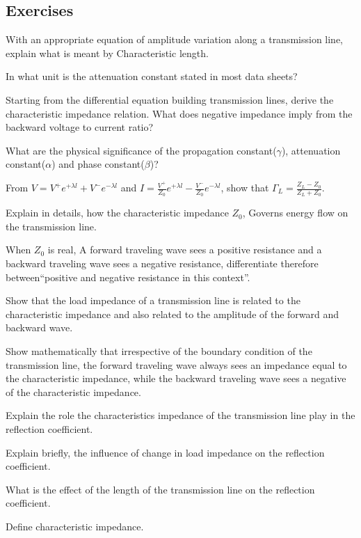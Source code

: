 \begin{mdframed}[backgroundcolor=lightblue, linewidth=1pt, hidealllines=true]
\section*{Exercises}
\begin{ExerciseList}
\Exercise[label={ex31}]
With an appropriate equation of amplitude variation along a transmission line, explain what is meant by Characteristic length.

\Exercise[label={ex32}]
In what unit is the attenuation constant stated in most data sheets?

\Exercise[label={ex33}]
Starting from the differential equation building transmission lines, derive the characteristic impedance relation. What does negative impedance imply from the backward voltage to current ratio?

\Exercise[label={ex34}]
What are the physical significance of the propagation constant($\gamma$), attenuation constant($\alpha$) and phase constant($\beta$)?

\Exercise[label={ex36}]
From $ V = V^+e^{+\lambda l} + V^-e^{-\lambda l} $ and $ I = \frac{V^+}{Z_0}e^{+\lambda l} - \frac{V^-}{Z_0}e^{-\lambda l}$, show that $ \Gamma_L = \frac{Z_L - Z_0}{Z_L + Z_0} $.

\Exercise[label={ex213}]
Explain in details, how the characteristic impedance $Z_0$, Governs energy flow on the transmission line.

\Exercise[label={ex214}]
When $Z_0$ is real, A forward traveling wave sees a positive resistance and a backward traveling wave sees a negative resistance, differentiate therefore  between“positive and negative resistance in this context”.

\Exercise[label={ex215}]
Show that the load impedance of a transmission line is related to the characteristic impedance and also related to the amplitude of the forward and backward wave.

\Exercise[label={ex216}]
Show mathematically that irrespective of the boundary condition of the transmission line, the forward traveling wave always sees an impedance equal to the characteristic impedance, while the backward traveling wave sees a negative of the characteristic impedance.

\Exercise[label={ex217}]
Explain the role the characteristics impedance of the transmission line play in the reflection coefficient.

\Exercise[label={ex217}]
Explain briefly, the influence of change in load impedance on the reflection coefficient.

\Exercise[label={ex217}]
What is the effect of the length of the transmission line on the reflection coefficient.

\Exercise[label={ex217}]
Define characteristic impedance.
\end{ExerciseList}

\end{mdframed}